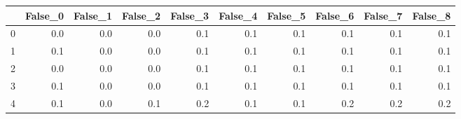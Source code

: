 \begin{tabular}{lrrrrrrrrr}
\toprule
{} &  False\_0 &  False\_1 &  False\_2 &  False\_3 &  False\_4 &  False\_5 &  False\_6 &  False\_7 &  False\_8 \\ \hline
\midrule
0 &      0.0 &      0.0 &      0.0 &      0.1 &      0.1 &      0.1 &      0.1 &      0.1 &      0.1 \\ \hline
1 &      0.1 &      0.0 &      0.0 &      0.1 &      0.1 &      0.1 &      0.1 &      0.1 &      0.1 \\ \hline
2 &      0.0 &      0.0 &      0.0 &      0.1 &      0.1 &      0.1 &      0.1 &      0.1 &      0.1 \\ \hline
3 &      0.1 &      0.0 &      0.0 &      0.1 &      0.1 &      0.1 &      0.1 &      0.1 &      0.1 \\ \hline
4 &      0.1 &      0.0 &      0.1 &      0.2 &      0.1 &      0.1 &      0.2 &      0.2 &      0.2 \\ \hline
\bottomrule
\end{tabular}
